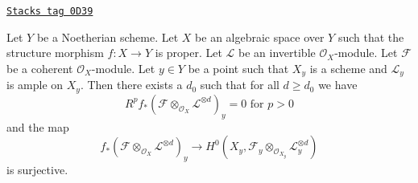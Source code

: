 \begin{lemma}
\label{spaces-divisors-lemma-ample-on-fibre}
\href{https://stacks.math.columbia.edu/tag/0D39}{\texttt{Stacks tag 0D39}}

Let $Y$ be a Noetherian scheme. Let $X$ be an algebraic space over $Y$
such that the structure morphism $f : X \to Y$ is proper.
Let $\mathcal{L}$ be an invertible $\mathcal{O}_X$-module.
Let $\mathcal{F}$ be a coherent $\mathcal{O}_X$-module.
Let $y \in Y$ be a point such that $X_y$ is a scheme and
$\mathcal{L}_y$ is ample on $X_y$.
Then there exists a $d_0$ such that for all $d \geq d_0$ we have
$$
R^pf_*(\mathcal{F} \otimes_{\mathcal{O}_X} \mathcal{L}^{\otimes d})_y = 0
\text{ for }p > 0
$$
and the map
$$
f_*(\mathcal{F} \otimes_{\mathcal{O}_X} \mathcal{L}^{\otimes d})_y
\longrightarrow
H^0(X_y, \mathcal{F}_y \otimes_{\mathcal{O}_{X_y}} \mathcal{L}_y^{\otimes d})
$$
is surjective.
\end{lemma}

